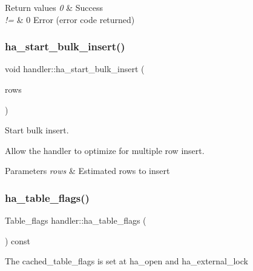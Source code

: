 \begin{DoxyRetVals}{Return values}
{\em 0} & Success \\
\hline
{\em !=} & 0 Error (error code returned) \\
\hline
\end{DoxyRetVals}
\mbox{\label{classhandler_a3f09a15d46c019a621b0a65bb1ec89d3}} 
\subsubsection{\texorpdfstring{ha\+\_\+start\+\_\+bulk\+\_\+insert()}{ha\_start\_bulk\_insert()}}
{\footnotesize\ttfamily void handler\+::ha\+\_\+start\+\_\+bulk\+\_\+insert (\begin{DoxyParamCaption}\item[{ha\+\_\+rows}]{rows }\end{DoxyParamCaption})}

Start bulk insert.

Allow the handler to optimize for multiple row insert.


\begin{DoxyParams}{Parameters}
{\em rows} & Estimated rows to insert \\
\hline
\end{DoxyParams}
\mbox{\label{classhandler_a6b3015577f49008561db1d34ae750e70}} 
\subsubsection{\texorpdfstring{ha\+\_\+table\+\_\+flags()}{ha\_table\_flags()}}
{\footnotesize\ttfamily Table\+\_\+flags handler\+::ha\+\_\+table\+\_\+flags (\begin{DoxyParamCaption}{ }\end{DoxyParamCaption}) const\hspace{0.3cm}{\ttfamily [inline]}}

The cached\+\_\+table\+\_\+flags is set at ha\+\_\+open and ha\+\_\+external\+\_\+lock \mbox{\label{classhandler_a69803cd29d92bfecd97212354212c516}} 
